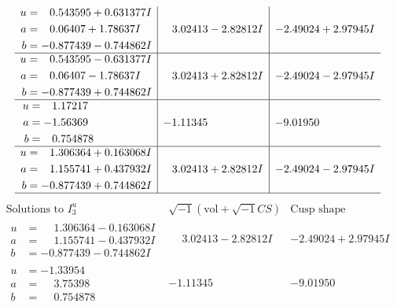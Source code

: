 \documentclass[1p]{elsarticle_modified}
\theoremstyle{definition}
\newcommand{\I}{\sqrt{-1}}
\begin{document}
$$\begin{array}{c|c|c}
\begin{aligned}
u &= \phantom{-}0.543595 + 0.631377 I \\
a &= \phantom{-}0.06407 + 1.78637 I \\
b &= -0.877439 - 0.744862 I\end{aligned}
 & \phantom{-}3.02413 - 2.82812 I & -2.49024 + 2.97945 I \\ \hline\begin{aligned}
u &= \phantom{-}0.543595 - 0.631377 I \\
a &= \phantom{-}0.06407 - 1.78637 I \\
b &= -0.877439 + 0.744862 I\end{aligned}
 & \phantom{-}3.02413 + 2.82812 I & -2.49024 - 2.97945 I \\ \hline\begin{aligned}
u &= \phantom{-}1.17217\phantom{ +0.000000I} \\
a &= -1.56369\phantom{ +0.000000I} \\
b &= \phantom{-}0.754878\phantom{ +0.000000I}\end{aligned}
 & -1.11345\phantom{ +0.000000I} & -9.01950\phantom{ +0.000000I} \\ \hline\begin{aligned}
u &= \phantom{-}1.306364 + 0.163068 I \\
a &= \phantom{-}1.155741 + 0.437932 I \\
b &= -0.877439 + 0.744862 I\end{aligned}
 & \phantom{-}3.02413 + 2.82812 I & -2.49024 - 2.97945 I\\
 \hline 
 \end{array}$$\newpage$$\begin{array}{c|c|c}  
\text{Solutions to }I^u_{3}& \I (\text{vol} + \sqrt{-1}CS) & \text{Cusp shape}\\
 \hline 
\begin{aligned}
u &= \phantom{-}1.306364 - 0.163068 I \\
a &= \phantom{-}1.155741 - 0.437932 I \\
b &= -0.877439 - 0.744862 I\end{aligned}
 & \phantom{-}3.02413 - 2.82812 I & -2.49024 + 2.97945 I \\ \hline\begin{aligned}
u &= -1.33954\phantom{ +0.000000I} \\
a &= \phantom{-}3.75398\phantom{ +0.000000I} \\
b &= \phantom{-}0.754878\phantom{ +0.000000I}\end{aligned}
 & -1.11345\phantom{ +0.000000I} & -9.01950\phantom{ +0.000000I} \\ \hline\begin{aligned}

\end{aligned}
\end{array}$$
\end{document}
